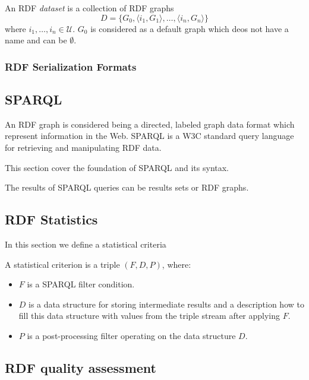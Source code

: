 \begin{definition}
An RDF \textit{dataset} is a collection of RDF graphs $$D = \{ G_{0},\langle i_1, G_1 \rangle, \dots , \langle i_n, G_n \rangle \}$$ where $i_1, \dots , i_n \in \mathcal{U}$.
$G_0$ is considered as a default graph which deos not have a name and can be $\emptyset$.
\end{definition}

\subsubsection{RDF Serialization Formats}

\subsection{SPARQL}
An \gls{RDF} graph is considered being a directed, labeled graph data format which represent information in the Web.
\gls{SPARQL} is a \gls{W3C} standard query language for retrieving and manipulating RDF data.

This section cover the foundation of SPARQL and its syntax. 

The results of SPARQL queries can be results sets or RDF graphs.

\subsection{RDF Statistics}
In this section we define a statistical criteria
\begin{definition}\cite{demter-2012-ekaw}
\label{def:preliminaries-statistics}
A statistical criterion is a triple $(F,D,P)$, where: \vspace{-5pt}
\begin{itemize}
	\item $F$ is a SPARQL filter condition.
	\item $D$ is a data structure for storing intermediate results and a description how to fill this data structure with values from the triple stream after applying $F$.
	\item $P$ is a post-processing filter operating on the data structure $D$.
\end{itemize} \vspace{-5pt}
\end{definition}

\subsection{RDF quality assessment}


